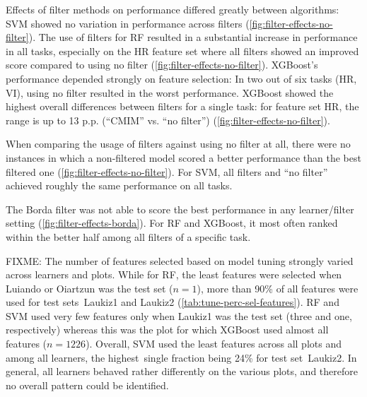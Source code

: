 \documentclass[remotesensing,article,submit,moreauthors,pdftex]{Definitions/mdpi}
\begin{document}
Effects of filter methods on performance differed greatly between algorithms:
SVM showed no variation in performance across filters (\autoref{fig:filter-effects-no-filter}).
The use of filters for RF resulted in a substantial increase in performance in all tasks, especially on the HR feature set where all filters showed an improved score compared to using no filter (\autoref{fig:filter-effects-no-filter}).
XGBoost's performance depended strongly on feature selection: In two out of six tasks (HR, VI), using no filter resulted in the worst performance.
XGBoost showed the highest overall differences between filters for a single task: for feature set HR, the range is up to 13 p.p. (\enquote{CMIM} vs. \enquote{no filter}) (\autoref{fig:filter-effects-no-filter}).

When comparing the usage of filters against using no filter at all, there were no instances in which a non-filtered model scored a better performance than the best filtered one (\autoref{fig:filter-effects-no-filter}).
For SVM, all filters and \enquote{no filter} achieved roughly the same performance on all tasks.

The Borda filter was not able to score the best performance in any learner/filter setting (\autoref{fig:filter-effects-borda}).
For RF and XGBoost, it most often ranked within the better half among all filters of a specific task.

FIXME:
The number of features selected based on model tuning strongly varied across learners and plots.
While for RF, the least features were selected when Luiando or Oiartzun was the test set ($n = 1$), more than 90\% of all features were used for test sets~Laukiz1 and Laukiz2 (\autoref{tab:tune-perc-sel-features}).
RF and SVM used very few features only when Laukiz1 was the test set (three and one, respectively) whereas this was the plot for which XGBoost used almost all features ($n = 1226$).
Overall, SVM used the least features across all plots and among all learners, the highest\ single fraction being 24\% for test set~Laukiz2.
In general, all learners behaved rather differently on the various plots, and therefore no overall pattern could be identified.
\end{document}
